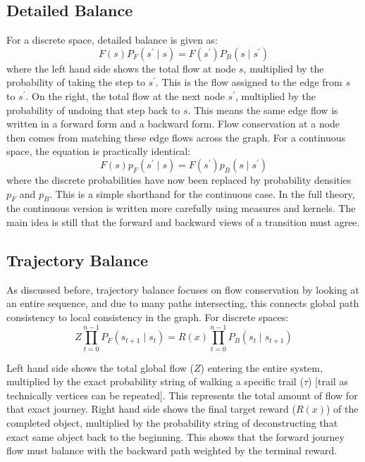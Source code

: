 \documentclass{article}
\begin{document}
\subsection{Detailed Balance}
For a discrete space, detailed balance is given as:
\begin{equation}
F(s)P_{F}(s^{\prime }\mid s)=F(s^{\prime })P_{B}(s\mid s^{\prime })
\end{equation}
where the left hand side shows the total flow at node $s$, multiplied by the probability of taking the step to $s^\prime$. This is the flow assigned to the edge from $s$ to $s^\prime$. On the right, the total flow at the next node $s^\prime$, multiplied by the probability of undoing that step back to $s$. This means the same edge flow is written in a forward form and a backward form. Flow conservation at a node then comes from matching these edge flows across the graph.
For a continuous space, the equation is practically identical:
\begin{equation}
F(s)p_{F}(s^{\prime }\mid s)=F(s^{\prime })p_{B}(s\mid s^{\prime })
\end{equation}
where the discrete probabilities have now been replaced by probability densities $p_F$ and $p_B$. This is a simple shorthand for the continuous case. In the full theory, the continuous version is written more carefully using measures and kernels. The main idea is still that the forward and backward views of a transition must agree.

\subsection{Trajectory Balance}
As discussed before, trajectory balance focuses on flow conservation by looking at an entire sequence, and due to many paths intersecting, this connects global path consistency to local consistency in the graph.
For discrete spaces:
\begin{equation}
Z\prod _{t=0}^{n-1}P_{F}(s_{t+1}\mid s_{t})=R(x)\prod _{t=0}^{n-1}P_{B}(s_{t}\mid s_{t+1})
\end{equation}

Left hand side shows the total global flow ($Z$) entering the entire system, multiplied by the exact probability string of walking a specific trail ($\tau$) [trail as technically vertices can be repeated]. This represents the total amount of flow for that exact journey. Right hand side shows the final target reward ($R(x)$) of the completed object, multiplied by the probability string of deconstructing that exact same object back to the beginning. This shows that the forward journey flow must balance with the backward path weighted by the terminal reward.
\end{document}
